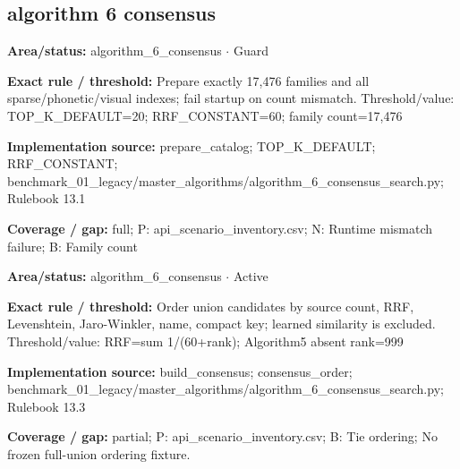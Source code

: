 \subsection*{algorithm 6 consensus}
\begin{tcolorbox}[enhanced,breakable,colback=white,colframe=Muted!45,boxrule=0.45pt,arc=1.5pt,left=6pt,right=6pt,top=5pt,bottom=5pt,title={\texttt{A6-CATALOG-INVARIANT-01}},title after break={\texttt{A6-CATALOG-INVARIANT-01}\ (continued)},fonttitle=\headingfont\bfseries\color{Navy},coltitle=Navy]
\textbf{Area/status:} algorithm\_\allowbreak{}6\_\allowbreak{}consensus $\boldsymbol{\cdot}$ Guard\par
\smallskip
\textbf{Exact rule / threshold:} Prepare exactly 17,476 families and all sparse/\allowbreak{}phonetic/\allowbreak{}visual indexes; fail startup on count mismatch. Threshold/\allowbreak{}value: TOP\_\allowbreak{}K\_\allowbreak{}DEFAULT=20; RRF\_\allowbreak{}CONSTANT=60; family count=17,476\par
\smallskip
\textbf{Implementation source:} prepare\_\allowbreak{}catalog; TOP\_\allowbreak{}K\_\allowbreak{}DEFAULT; RRF\_\allowbreak{}CONSTANT; benchmark\_\allowbreak{}01\_\allowbreak{}legacy/\allowbreak{}master\_\allowbreak{}algorithms/\allowbreak{}algorithm\_\allowbreak{}6\_\allowbreak{}consensus\_\allowbreak{}search.py; Rulebook 13.1\par
\smallskip
\textbf{Coverage / gap:} full; P: api\_\allowbreak{}scenario\_\allowbreak{}inventory.csv; N: Runtime mismatch failure; B: Family count
\end{tcolorbox}
\begin{tcolorbox}[enhanced,breakable,colback=white,colframe=Muted!45,boxrule=0.45pt,arc=1.5pt,left=6pt,right=6pt,top=5pt,bottom=5pt,title={\texttt{A6-CONSENSUS-ORDER-04}},title after break={\texttt{A6-CONSENSUS-ORDER-04}\ (continued)},fonttitle=\headingfont\bfseries\color{Navy},coltitle=Navy]
\textbf{Area/status:} algorithm\_\allowbreak{}6\_\allowbreak{}consensus $\boldsymbol{\cdot}$ Active\par
\smallskip
\textbf{Exact rule / threshold:} Order union candidates by source count, RRF, Levenshtein, Jaro-Winkler, name, compact key; learned similarity is excluded. Threshold/\allowbreak{}value: RRF=sum 1/\allowbreak{}(60+rank); Algorithm5 absent rank=999\par
\smallskip
\textbf{Implementation source:} build\_\allowbreak{}consensus; consensus\_\allowbreak{}order; benchmark\_\allowbreak{}01\_\allowbreak{}legacy/\allowbreak{}master\_\allowbreak{}algorithms/\allowbreak{}algorithm\_\allowbreak{}6\_\allowbreak{}consensus\_\allowbreak{}search.py; Rulebook 13.3\par
\smallskip
\textbf{Coverage / gap:} partial; P: api\_\allowbreak{}scenario\_\allowbreak{}inventory.csv; B: Tie ordering; No frozen full-union ordering fixture.
\end{tcolorbox}
